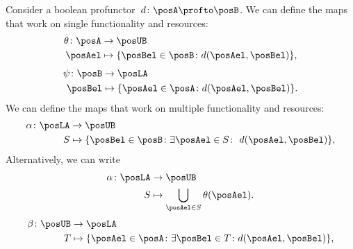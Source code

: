 Consider a boolean profunctor~$d\colon \posA \profto \posB$.
We can define the maps that work on single functionality and resources:
%
\begin{equation}
    \begin{aligned}
        \theta\colon \posA & \to \posUB                                                \\
        \posAel            & \mapsto \{\posBel\in \posB \colon d(\posAel, \posBel) \},
    \end{aligned}
\end{equation}
%
\begin{equation}
    \begin{aligned}
        \psi\colon \posB & \to \posLA                                                \\
        \posBel          & \mapsto \{\posAel\in \posA \colon d(\posAel, \posBel) \}.
    \end{aligned}
\end{equation}
We can define the maps that work on multiple functionality and resources:
\begin{equation}
    \label{eq:galoisalfa}
    \begin{aligned}
        \alpha\colon \posLA & \to \posUB                                                                           \\
        S                   & \mapsto \{\posBel\in \posB \colon \exists \posAel\in S\colon \ d(\posAel,\posBel)\},
    \end{aligned}
\end{equation}
Alternatively, we can write
\begin{equation}
    \begin{aligned}
        \alpha \colon \posLA & \to \posUB                                      \\
        S                    & \mapsto \bigcup_{\posAel\in S} \theta(\posAel).
    \end{aligned}
\end{equation}
%
\begin{equation}
    \label{eq:galoisbeta}
    \begin{aligned}
        \beta\colon \posUB & \to \posLA                                                                          \\
        T                  & \mapsto \{\posAel\in \posA  \colon \exists \posBel\in T\colon d(\posAel,\posBel)\},
    \end{aligned}
\end{equation}
